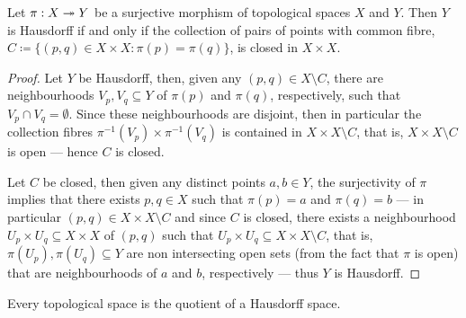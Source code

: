 \begin{proposition}
    \label{prop:open-quotient-hausdorff}
    Let \(\pi: X \twoheadrightarrow Y\) be a surjective morphism of topological spaces \(X\) and
    \(Y\). Then \(Y\) is Hausdorff if and only if the collection of pairs of points
    with common fibre,
    \(C \coloneqq \{(p, q) \in X \times X \colon \pi(p) = \pi(q)\}\), is closed in
    \(X \times X\).
\end{proposition}

\begin{proof}
    Let \(Y\) be Hausdorff, then, given any \((p, q) \in X \setminus C\), there are
    neighbourhoods \(V_p, V_q \subseteq Y\) of \(\pi(p)\) and \(\pi(q)\),
    respectively, such that \(V_p \cap V_q = \emptyset\). Since these neighbourhoods
    are disjoint, then in particular the collection fibres \(\pi^{-1}(V_p) \times
    \pi^{-1}(V_q)\) is contained in \(X \times X \setminus C\), that is, \(X \times
    X \setminus C\) is open --- hence \(C\) is closed.

    Let \(C\) be closed, then given any distinct points \(a, b \in Y\), the
    surjectivity of \(\pi\) implies that there exists \(p, q \in X\) such that
    \(\pi(p) = a\) and \(\pi(q) = b\) --- in particular \((p, q) \in X \times X
    \setminus C\) and since \(C\) is closed, there exists a neighbourhood \(U_p
    \times U_q \subseteq X \times X\) of \((p, q)\) such that \(U_p \times U_q
    \subseteq X \times X \setminus C\), that is, \(\pi(U_p), \pi(U_q) \subseteq Y\)
    are non intersecting open sets (from the fact that \(\pi\) is open) that are
    neighbourhoods of \(a\) and \(b\), respectively --- thus \(Y\) is Hausdorff.
\end{proof}

\begin{proposition}
    \label{prop:top-space-is-quotient-of-hausdorff}
    Every topological space is the quotient of a Hausdorff space.
\end{proposition}

